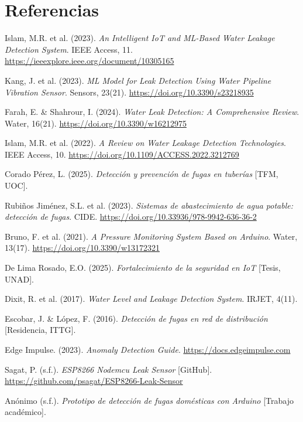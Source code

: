 \documentclass[11pt,a4paper]{article}
\begin{document}
\section*{\small Referencias}
\vspace{-4pt}
{\footnotesize
\begin{enumerate}[label={[\arabic*]},leftmargin=*,nosep,itemsep=1pt]
\item Islam, M.R. et al. (2023). \textit{An Intelligent IoT and ML-Based Water Leakage Detection System}. IEEE Access, 11. \url{https://ieeexplore.ieee.org/document/10305165}
\item Kang, J. et al. (2023). \textit{ML Model for Leak Detection Using Water Pipeline Vibration Sensor}. Sensors, 23(21). \url{https://doi.org/10.3390/s23218935}
\item Farah, E. \& Shahrour, I. (2024). \textit{Water Leak Detection: A Comprehensive Review}. Water, 16(21). \url{https://doi.org/10.3390/w16212975}
\item Islam, M.R. et al. (2022). \textit{A Review on Water Leakage Detection Technologies}. IEEE Access, 10. \url{https://doi.org/10.1109/ACCESS.2022.3212769}
\item Corado Pérez, L. (2025). \textit{Detección y prevención de fugas en tuberías} [TFM, UOC].
\item Rubiños Jiménez, S.L. et al. (2023). \textit{Sistemas de abastecimiento de agua potable: detección de fugas}. CIDE. \url{https://doi.org/10.33936/978-9942-636-36-2}
\item Bruno, F. et al. (2021). \textit{A Pressure Monitoring System Based on Arduino}. Water, 13(17). \url{https://doi.org/10.3390/w13172321}
\item De Lima Rosado, E.O. (2025). \textit{Fortalecimiento de la seguridad en IoT} [Tesis, UNAD].
\item Dixit, R. et al. (2017). \textit{Water Level and Leakage Detection System}. IRJET, 4(11).
\item Escobar, J. \& López, F. (2016). \textit{Detección de fugas en red de distribución} [Residencia, ITTG].
\item Edge Impulse. (2023). \textit{Anomaly Detection Guide}. \url{https://docs.edgeimpulse.com}
\item Sagat, P. (s.f.). \textit{ESP8266 Nodemcu Leak Sensor} [GitHub]. \url{https://github.com/psagat/ESP8266-Leak-Sensor}
\item Anónimo (s.f.). \textit{Prototipo de detección de fugas domésticas con Arduino} [Trabajo académico].
\end{enumerate}
}
\end{document}
